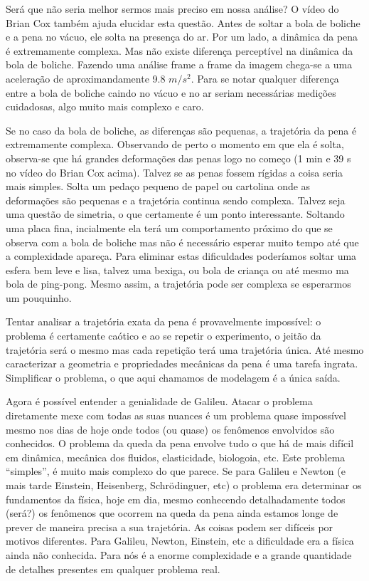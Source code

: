 \documentclass[article,12pt,oneside,a4paper,english,brazil,sumario=tradicional]{abntex2}
\begin{document}
Será que não seria melhor sermos mais preciso em nossa análise? O vídeo do Brian Cox também ajuda elucidar esta questão. Antes de soltar a bola de boliche e a pena no vácuo, ele solta na presença do ar. Por um lado, a dinâmica da pena é extremamente complexa. Mas não existe diferença perceptível na dinâmica da bola de boliche. Fazendo uma análise frame a frame da imagem chega-se a uma aceleração de aproximandamente 9.8 $m/s^2$. Para se notar qualquer diferença entre a bola de boliche caindo no vácuo e no ar seriam necessárias medições cuidadosas, algo muito mais complexo e caro.

Se no caso da bola de boliche, as diferenças são pequenas, a trajetória da pena é extremamente complexa. Observando de perto o momento em que ela é solta, observa-se que há grandes deformações das penas logo no começo (1 min e 39 s no vídeo do Brian Cox acima). Talvez se as penas fossem rígidas a coisa seria mais simples. Solta um pedaço pequeno de papel ou cartolina onde as deformações são pequenas e a trajetória continua sendo complexa. Talvez seja uma questão de simetria, o que certamente é um ponto interessante. Soltando uma placa fina, incialmente ela terá um comportamento próximo do que se observa com a bola de boliche mas não é necessário esperar muito tempo até que a complexidade apareça. Para eliminar estas dificuldades poderíamos soltar uma esfera bem leve e lisa, talvez uma bexiga, ou bola de criança ou até mesmo ma bola de ping-pong. Mesmo assim, a trajetória pode ser complexa se esperarmos um pouquinho.


Tentar analisar a trajetória exata da pena é provavelmente impossível: o problema é certamente caótico e ao se repetir o experimento, o jeitão da trajetória será o mesmo mas cada repetição terá uma trajetória única. Até mesmo caracterizar a geometria e propriedades mecânicas da pena é uma tarefa ingrata. Simplificar o problema, o que aqui chamamos de modelagem é a única saída.

Agora é possível entender a genialidade de Galileu. Atacar o problema diretamente mexe com todas as suas nuances  é um problema quase impossível mesmo nos dias de hoje onde todos (ou quase) os fenômenos envolvidos são conhecidos. O problema da queda da pena envolve tudo o que há de mais difícil  em dinâmica, mecânica dos fluidos, elasticidade, biologoia, etc. Este problema ``simples'', é muito mais complexo do que parece. Se para Galileu e Newton (e mais tarde Einstein, Heisenberg, Schrödinguer, etc) o problema era determinar os fundamentos da física, hoje em dia, mesmo conhecendo detalhadamente todos (será?) os fenômenos que ocorrem na queda da pena ainda estamos longe de prever de maneira precisa a sua trajetória. As coisas podem ser difíceis por motivos diferentes. Para Galileu, Newton, Einstein, etc a dificuldade era a física ainda não conhecida. Para nós é a enorme complexidade e a grande quantidade de detalhes presentes em qualquer problema real.
\end{document}
